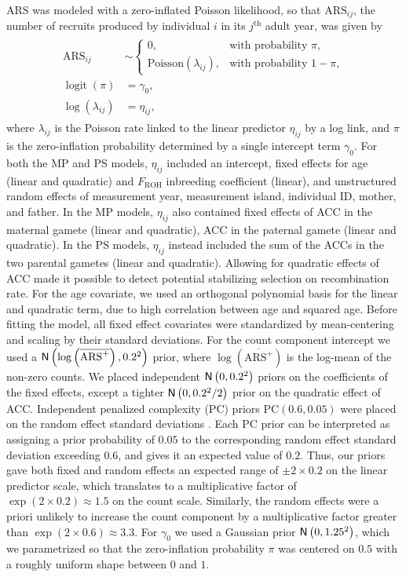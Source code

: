 \documentclass[dvipsnames]{article}
\begin{document}
ARS was modeled with a zero-inflated Poisson likelihood, so that $\text{ARS}_{ij}$, the number of recruits produced by individual $i$ in its $j^\text{th}$ adult year, was given by
\begin{align} %
\begin{split}
\label{eq-ars}
\mathrm{ARS}_{ij} &\sim
\begin{cases}
0, & \text{with probability } \pi,\\[-10pt]
\mathrm{Poisson}(\lambda_{ij}), & \text{with probability } 1-\pi,
\end{cases}
\\[-5pt]
\operatorname{logit}(\pi) &= \gamma_0,
\\[-10pt]
\log(\lambda_{ij}) &= \eta_{ij},
\end{split}
\end{align}
where $\lambda_{ij}$ is the Poisson rate linked to the linear predictor $\eta_{ij}$ by a log link, and $\pi$ is the zero-inflation probability determined by a single intercept term $\gamma_0$.
For both the MP and PS models, $\eta_{ij}$ included an intercept, fixed effects for age (linear and quadratic) and $F_\text{ROH}$ inbreeding coefficient (linear), and unstructured random effects of measurement year, measurement island, individual ID, mother, and father.
In the MP models, $\eta_{ij}$ also contained fixed effects of ACC in the maternal gamete (linear and quadratic), ACC in the paternal gamete (linear and quadratic). 
In the PS models, $\eta_{ij}$ instead included the sum of the ACCs in the two parental gametes (linear and quadratic).
Allowing for quadratic effects of ACC made it possible to detect potential stabilizing selection on recombination rate.
For the age covariate, we used an orthogonal polynomial basis for the linear and quadratic term, due to high correlation between age and squared age.
Before fitting the model, all fixed effect covariates were standardized by mean-centering and scaling by their standard deviations.
For the count component intercept we used a $\mathsf{N}\left(\log\left(\overline{\mathrm{ARS}^{+}}\right), 0.2^2\right)$ prior, where $\log\left(\overline{\mathrm{ARS}^{+}}\right)$ is the log-mean of the non-zero counts.
We placed independent $\mathsf{N}\left(0, 0.2^2\right)$ priors on the coefficients of the fixed effects, except a tighter $\mathsf{N}\left(0, 0.2^2/2\right)$ prior on the quadratic effect of ACC.
Independent penalized complexity ($\mathrm{PC}$) priors $\mathrm{PC}(0.6, 0.05)$ were placed on the random effect standard deviations \citep{simpson2017penalising}.
Each $\mathrm{PC}$ prior can be interpreted as assigning a prior probability of $0.05$ to the corresponding random effect standard deviation exceeding $0.6$, and gives it an expected value of $0.2$.
Thus, our priors gave both fixed and random effects an expected range of $\pm 2\times0.2$ on the linear predictor scale, which translates to a multiplicative factor of $\exp(2\times0.2)\approx 1.5$ on the count scale.
Similarly, the random effects were a priori unlikely to increase the count component by a multiplicative factor greater than $\exp(2\times0.6)\approx 3.3$.
For $\gamma_0$ we used a Gaussian prior $\mathsf{N}\left(0, 1.25^2\right)$, which we parametrized so that the zero-inflation probability $\pi$ was centered on $0.5$ with a roughly uniform shape between $0$ and $1$.
\end{document}
